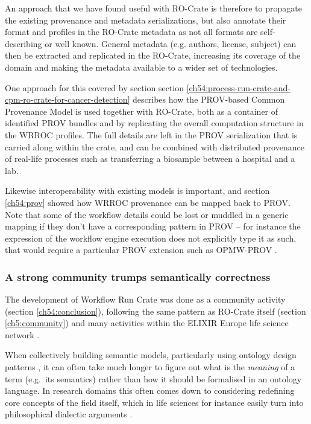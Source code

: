An approach that we have found useful with RO-Crate is therefore to propagate the existing provenance and metadata serializations, but also annotate their format and profiles in the RO-Crate metadata as not all formats are self-describing or well known. General metadata (e.g. authors, license, subject) can then be extracted and replicated in the RO-Crate, increasing its coverage of the domain and making the metadata available to a wider set of technologies. 

One approach for this covered by section section \vref{ch54:process-run-crate-and-cpm-ro-crate-for-cancer-detection} describes how the PROV-based Common Provenance Model \cite{Wittner 2023} is used together with RO-Crate, both as a container of identified PROV bundles and by replicating the overall computation structure in the WRROC profiles.  The full details are left in the PROV serialization that is carried along within the crate, and can be combined with distributed provenance of real-life processes such as transferring a biosample between a hospital and a lab. 

Likewise interoperability with existing models is important, and section \vref{ch54:prov} showed how WRROC provenance can be mapped back to PROV. Note that some of the workflow details could be lost or muddled in a generic mapping if they don't have a corresponding pattern in PROV -- for instance the expression of the workflow engine execution does not explicitly type it as such, that would require a particular PROV extension such as OPMW-PROV \cite{Garijo 2011}. 


\subsubsection{A strong community trumps semantically correctness}

The development of Workflow Run Crate was done as a community activity (section \vref{ch54:conclusion}), following the same pattern as RO-Crate itself (section \vref{ch5:community}) and many activities within the ELIXIR Europe life science network \cite{Harrow 2022}. 

When collectively building semantic models, particularly using ontology design patterns \cite{Hitzler 2016}, it can often take much longer to figure out what is the \emph{meaning} of a term (e.g.~its semantics) rather than how it should be formalised in an ontology language. In research domains this often comes down to considering redefining core concepts of the field itself, which in life sciences for instance easily turn into philosophical dialectic arguments \cite{Falk 2010}. 


